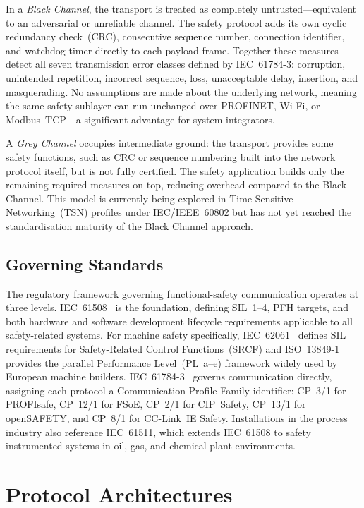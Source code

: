 \documentclass[conference]{IEEEtran}
\begin{document}
In a \emph{Black Channel}, the transport is treated as completely
untrusted---equivalent to an adversarial or unreliable channel.
The safety protocol adds its own cyclic redundancy check~(CRC),
consecutive sequence number, connection identifier, and watchdog timer
directly to each payload frame. Together these measures detect all seven
transmission error classes defined by IEC~61784-3: corruption, unintended
repetition, incorrect sequence, loss, unacceptable delay, insertion, and
masquerading. No assumptions are made about the underlying network,
meaning the same safety sublayer can run unchanged over PROFINET, Wi-Fi,
or Modbus~TCP---a significant advantage for system integrators.

A \emph{Grey Channel} occupies intermediate ground: the transport provides
some safety functions, such as CRC or sequence numbering built into the
network protocol itself, but is not fully certified. The safety application
builds only the remaining required measures on top, reducing overhead
compared to the Black Channel. This model is currently being explored in
Time-Sensitive Networking~(TSN) profiles under IEC/IEEE~60802 but has not
yet reached the standardisation maturity of the Black Channel approach.

\subsection{Governing Standards}

The regulatory framework governing functional-safety communication operates
at three levels. IEC~61508~\cite{IEC61508} is the foundation, defining
SIL~1--4, PFH targets, and both hardware and software development lifecycle
requirements applicable to all safety-related systems. For machine safety
specifically, IEC~62061~\cite{IEC62061} defines SIL requirements for
Safety-Related Control Functions~(SRCF) and ISO~13849-1~\cite{ISO13849}
provides the parallel Performance Level~(PL~a--e) framework widely used
by European machine builders. IEC~61784-3~\cite{IEC617843} governs
communication directly, assigning each protocol a Communication Profile
Family identifier: CP~3/1 for PROFIsafe, CP~12/1 for FSoE, CP~2/1 for
CIP~Safety, CP~13/1 for openSAFETY, and CP~8/1 for CC-Link~IE Safety.
Installations in the process industry also reference IEC~61511, which
extends IEC~61508 to safety instrumented systems in oil, gas, and
chemical plant environments.

\section{Protocol Architectures}
\end{document}
